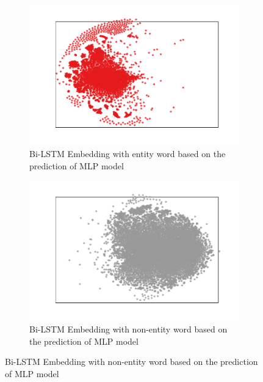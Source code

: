\documentclass{article}
\begin{document}
\begin{figure}[t]
	\centering
	\begin{subfigure}{0.5\textwidth}
		\includegraphics[width=\linewidth]{bi_lstm_mlp_positive.pdf}
		\caption{Bi-LSTM Embedding with entity word based on the prediction of MLP model}
		\label{fig:bi_lstm_mlp_positive}
	\end{subfigure}\hfil 
	\begin{subfigure}{0.5\textwidth}
		\includegraphics[width=\linewidth]{bi_lstm_mlp_negative.pdf}
		\caption{Bi-LSTM Embedding with non-entity word based on the prediction of MLP model}
		\label{fig:bi_lstm_mlp_negative}
	\end{subfigure}
\end{figure}
\end{document}
